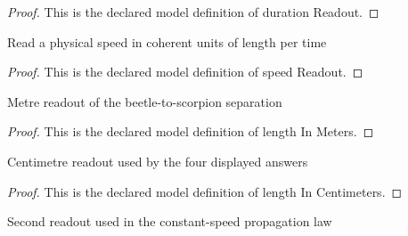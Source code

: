 \begin{proof}
  This is the declared model definition of duration Readout.
\end{proof}
\begin{definition}
  \label{def:physics:phyx-mini-0286:phyxminiproblems-problemphyxmini0286-speedreadout}
  Read a physical speed in coherent units of length per time
\end{definition}
\begin{proof}
  This is the declared model definition of speed Readout.
\end{proof}
\begin{definition}
  \label{def:physics:phyx-mini-0286:phyxminiproblems-problemphyxmini0286-lengthinmeters}
  Metre readout of the beetle-to-scorpion separation
\end{definition}
\begin{proof}
  This is the declared model definition of length In Meters.
\end{proof}
\begin{definition}
  \label{def:physics:phyx-mini-0286:phyxminiproblems-problemphyxmini0286-lengthincentimeters}
  Centimetre readout used by the four displayed answers
\end{definition}
\begin{proof}
  This is the declared model definition of length In Centimeters.
\end{proof}
\begin{definition}
  \label{def:physics:phyx-mini-0286:phyxminiproblems-problemphyxmini0286-durationinseconds}
  Second readout used in the constant-speed propagation law
\end{definition}
